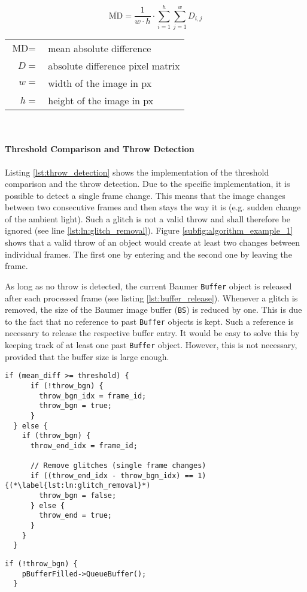 \begin{equation}
  \overline{\text{MD}} = \frac{1}{w\cdot h} \cdot \sum\limits_{i=1}^h \sum\limits_{j=1}^w D_{i,j}
  \label{eq:mean_diff}
\end{equation}

\begin{tabular}{rl}
  $\text{MD} =$ & mean absolute difference \\
  $D =$ & absolute difference pixel matrix \\
  $w =$ & width of the image in px \\
  $h =$ & height of the image in px \\
\end{tabular}
\\

\paragraph{Threshold Comparison and Throw Detection}
Listing \ref{lst:throw_detection} shows the implementation of the threshold comparison and the throw detection.
Due to the specific implementation, it is possible to detect a single frame change.
This means that the image changes between two consecutive frames and then stays the way it is (e.g. sudden change of the ambient light).
Such a glitch is not a valid throw and shall therefore be ignored (see line \ref{lst:ln:glitch_removal}).
Figure \ref{subfig:algorithm_example_1} shows that a valid throw of an object would create at least two changes between individual frames.
The first one by entering and the second one by leaving the frame.

As long as no throw is detected, the current Baumer \texttt{Buffer} object is released after each processed frame (see listing \ref{lst:buffer_release}).
Whenever a glitch is removed, the size of the Baumer image buffer (\texttt{BS}) is reduced by one.
This is due to the fact that no reference to past \texttt{Buffer} objects is kept.
Such a reference is necessary to release the respective buffer entry.
It would be easy to solve this by keeping track of at least one past \texttt{Buffer} object.
However, this is not necessary, provided that the buffer size is large enough.

\clearpage

\begin{lstlisting}[style=C++, caption={Throw detection and glitch removal}, label=lst:throw_detection]
  if (mean_diff >= threshold) {
      if (!throw_bgn) {
        throw_bgn_idx = frame_id;
        throw_bgn = true;
      }
  } else {
    if (throw_bgn) {
      throw_end_idx = frame_id;

      // Remove glitches (single frame changes)
      if ((throw_end_idx - throw_bgn_idx) == 1) {(*\label{lst:ln:glitch_removal}*)
        throw_bgn = false;
      } else {
        throw_end = true;
      }
    }
  }
\end{lstlisting}

\begin{lstlisting}[style=C++, caption={Release of the filled Baumer \texttt{Buffer} object}, label=lst:buffer_release]
  if (!throw_bgn) {
    pBufferFilled->QueueBuffer();
  }
\end{lstlisting}
